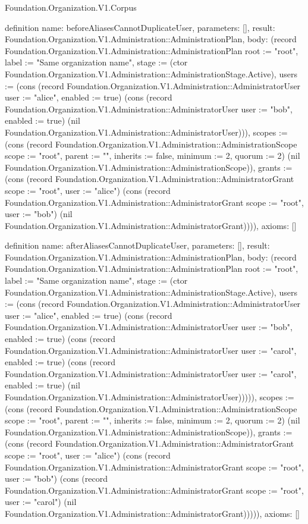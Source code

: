 \begin{lexlean}{Foundation.Organization.V1.Corpus}
\begin{semanticmodule}
definition{
  name: beforeAliasesCannotDuplicateUser,
  parameters: [],
  result: Foundation.Organization.V1.Administration::AdministrationPlan,
  body: (record Foundation.Organization.V1.Administration::AdministrationPlan {root := "root", label := "Same organization name", stage := (ctor Foundation.Organization.V1.Administration::AdministrationStage.Active), users := (cons (record Foundation.Organization.V1.Administration::AdministratorUser {user := "alice", enabled := true}) (cons (record Foundation.Organization.V1.Administration::AdministratorUser {user := "bob", enabled := true}) (nil Foundation.Organization.V1.Administration::AdministratorUser))), scopes := (cons (record Foundation.Organization.V1.Administration::AdministrationScope {scope := "root", parent := "", inherits := false, minimum := 2, quorum := 2}) (nil Foundation.Organization.V1.Administration::AdministrationScope)), grants := (cons (record Foundation.Organization.V1.Administration::AdministratorGrant {scope := "root", user := "alice"}) (cons (record Foundation.Organization.V1.Administration::AdministratorGrant {scope := "root", user := "bob"}) (nil Foundation.Organization.V1.Administration::AdministratorGrant)))}),
  axioms: []
}

definition{
  name: afterAliasesCannotDuplicateUser,
  parameters: [],
  result: Foundation.Organization.V1.Administration::AdministrationPlan,
  body: (record Foundation.Organization.V1.Administration::AdministrationPlan {root := "root", label := "Same organization name", stage := (ctor Foundation.Organization.V1.Administration::AdministrationStage.Active), users := (cons (record Foundation.Organization.V1.Administration::AdministratorUser {user := "alice", enabled := true}) (cons (record Foundation.Organization.V1.Administration::AdministratorUser {user := "bob", enabled := true}) (cons (record Foundation.Organization.V1.Administration::AdministratorUser {user := "carol", enabled := true}) (cons (record Foundation.Organization.V1.Administration::AdministratorUser {user := "carol", enabled := true}) (nil Foundation.Organization.V1.Administration::AdministratorUser))))), scopes := (cons (record Foundation.Organization.V1.Administration::AdministrationScope {scope := "root", parent := "", inherits := false, minimum := 2, quorum := 2}) (nil Foundation.Organization.V1.Administration::AdministrationScope)), grants := (cons (record Foundation.Organization.V1.Administration::AdministratorGrant {scope := "root", user := "alice"}) (cons (record Foundation.Organization.V1.Administration::AdministratorGrant {scope := "root", user := "bob"}) (cons (record Foundation.Organization.V1.Administration::AdministratorGrant {scope := "root", user := "carol"}) (nil Foundation.Organization.V1.Administration::AdministratorGrant))))}),
  axioms: []
}


\end{semanticmodule}
\end{lexlean}
